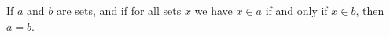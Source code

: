 If $a$ and $b$ are sets, and if for all sets $x$ we have $x \in a$ if and only if $x \in b$, then $a = b$.
